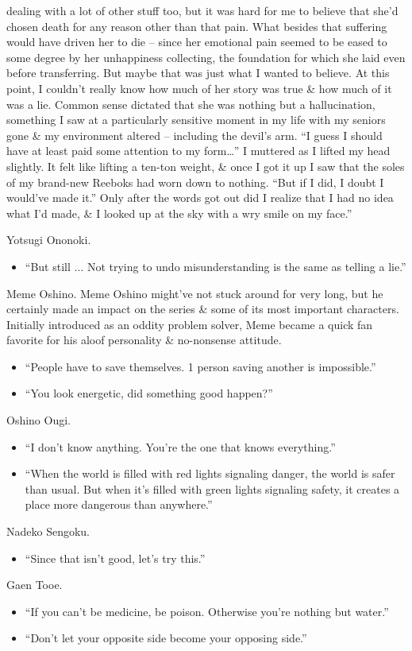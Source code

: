 \documentclass{article}
\begin{document}
\begin{enumerate}
\begin{itemize}
dealing with a lot of other stuff too, but it was hard for me to believe that she'd chosen death for any reason other than that pain. What besides that suffering would have driven her to die -- since her emotional pain seemed to be eased to some degree by her unhappiness collecting, the foundation for which she laid even before transferring. But maybe that was just what I wanted to believe. At this point, I couldn't really know how much of her story was true \& how much of it was a lie. Common sense dictated that she was nothing but a hallucination, something I saw at a particularly sensitive moment in my life with my seniors gone \& my environment altered -- including the devil's arm. ``I guess I should have at least paid some attention to my form…'' I muttered as I lifted my head slightly. It felt like lifting a ten-ton weight, \& once I got it up I saw that the soles of my brand-new Reeboks had worn down to nothing. ``But if I did, I doubt I would've made it.'' Only after the words got out did I realize that I had no idea what I'd made, \& I looked up at the sky with a wry smile on my face.''
    \end{itemize}
    {\sf Yotsugi Ononoki.}
    \begin{itemize}
    	\item ``But still $\ldots$ Not trying to undo misunderstanding is the same as telling a lie.''
    \end{itemize}
    {\sf Meme Oshino.} Meme Oshino might've not stuck around for very long, but he certainly made an impact on the series \& some of its most important characters. Initially introduced as an oddity problem solver, Meme became a quick fan favorite for his aloof personality \& no-nonsense attitude.
    \begin{itemize}
    	\item ``People have to save themselves. 1 person saving another is impossible.''
    	\item ``You look energetic, did something good happen?''
    \end{itemize}
    {\sf Oshino Ougi.}
    \begin{itemize}
    	\item ``I don't know anything. You're the one that knows everything.''
    	\item ``When the world is filled with red lights signaling danger, the world is safer than usual. But when it's filled with green lights signaling safety, it creates a place more dangerous than anywhere.''
    \end{itemize}
    {\sf Nadeko Sengoku.}
    \begin{itemize}
    	\item ``Since that isn't good, let's try this.''
    \end{itemize}
    {\sf Gaen Tooe.}
    \begin{itemize}
    	\item ``If you can't be medicine, be poison. Otherwise you're nothing but water.''
    	\item ``Don't let your opposite side become your opposing side.''
    \end{itemize}
    

\end{enumerate}
\end{document}
